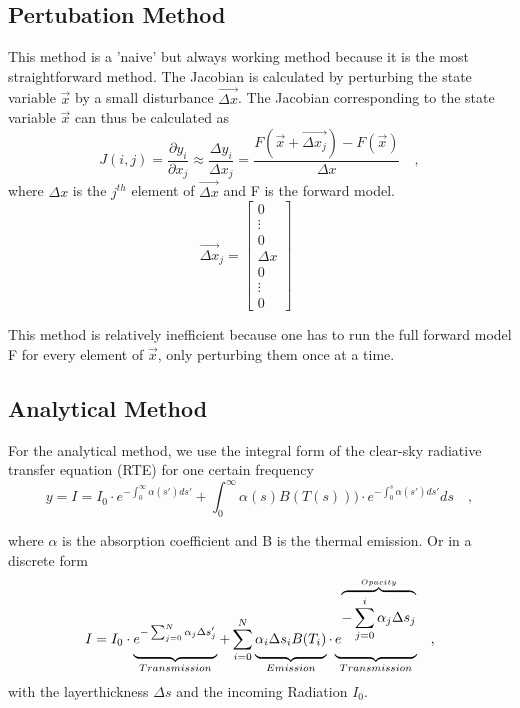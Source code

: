 \subsection*{Pertubation Method}
This method is a 'naive' but always working method because it is the most
straightforward method. The Jacobian is calculated by perturbing the state
variable $\vec{x}$ by a small disturbance $\vec{\Delta x}$. The Jacobian
corresponding to the state variable $\vec{x}$ can thus be calculated as
\begin{equation}
J(i,j)=\frac{\partial y_i}{\partial x_j} \approx \frac{\Delta y_i}{\Delta x_j} =
\frac{F(\vec{x}+\vec{\Delta x_j})-F(\vec{x})}{\Delta x} \quad ,
\end{equation}
where $\Delta x$ is the $j^{th}$ element of $\vec{\Delta x} $ and F is the
forward model.
{
	\begin{equation*}
	\vec{\Delta x}_j=\left[\begin{array}{c} 0 \\ \vdots \\0\\ \Delta x \\ 0\\ \vdots
	\\0\end{array}\right] \qquad
	\end{equation*}
}

This method is relatively inefficient because one has to run the full forward
model F for every element of $\vec{x}$, only perturbing them once at a time.

\subsection*{Analytical Method}
For the analytical method, we use the integral form of the clear-sky radiative
transfer equation (RTE) for one certain frequency
\begin{equation*}
y=I=I_0 \cdot e^{-\int_0^\infty \alpha(s') ds'}+ \int_0^\infty \alpha(s)B(T(s)))
\cdot e^{-\int_0^s \alpha(s')ds'} ds \quad ,
\end{equation*}

where $\alpha$ is the absorption coefficient and B is the thermal emission. Or
in a discrete form
\begin{equation*}
I=I_0 \cdot \underbrace{\vphantom{\frac{a}{b}}e^{-\sum_{j=0}^N \alpha_j \Delta
		s_j'}}_{\substack{Transmission}}+ \sum_{i=0}^N
\underbrace{\vphantom{\frac{a}{b}}\alpha_i \Delta s_i
	B(T_i)}_{\substack{Emission}} \cdot
\underbrace{\vphantom{\frac{a}{b}}e^{\overbrace{-\sum_{j=0}^i \alpha_j \Delta
			s_j}^{Opacity}}}_{\substack{Transmission}} \quad ,
\end{equation*}
with the layerthickness $\Delta s$ and the incoming Radiation $I_0$.\\

